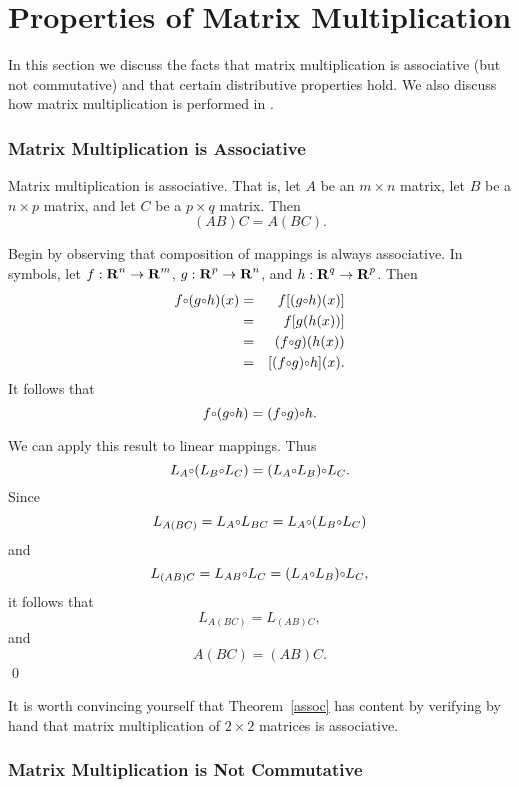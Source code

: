 \section{Properties of Matrix Multiplication} \label{S:4.7}

In this section we discuss the facts that matrix multiplication is
associative (but not commutative) and that certain distributive
properties hold.  We also discuss how matrix multiplication is
performed in \Matlab.

\subsubsection*{Matrix Multiplication is Associative}

\begin{thm} \label{assoc}
Matrix multiplication is associative.  That is, let $A$ be an
$m\times n$ matrix, let $B$ be a $n\times p$ matrix, and let $C$
be a $p\times q$ matrix.  Then
\[
(AB)C = A(BC).
\]
\end{thm}

\proof Begin by observing that composition of mappings is always
associative.  In symbols, let $f:\mbox{$\bf{R}$}^n\to\mbox{$\bf{R}$}^m$, $g:\mbox{$\bf{R}$}^p\to\mbox{$\bf{R}$}^n$,
and $h:\mbox{$\bf{R}$}^q\to\mbox{$\bf{R}$}^p$.  Then
\begin{eqnarray*}
f\compose (g\compose h)(x) & = & f[(g\compose h)(x)] \\
  & = & f[g(h(x))] \\
  & = & (f\compose g)(h(x)) \\
  & = & [(f\compose g)\compose h](x).
\end{eqnarray*}
It follows that
\[
f\compose (g\compose h) = (f\compose g)\compose h.
\]

We can apply this result to linear mappings.  Thus
\[
L_A\compose (L_B\compose L_C) = (L_A\compose L_B)\compose L_C.
\]
Since
\[
L_{A(BC)} = L_A\compose L_{BC} = L_A\compose (L_B\compose L_C)
\]
and
\[
L_{(AB)C} = L_{AB}\compose L_C = (L_A\compose L_B)\compose L_C,
\]
it follows that
\[
L_{A(BC)} = L_{(AB)C},
\]
and
\[
A(BC) = (AB)C.
\]
\qed

It is worth convincing yourself that Theorem~\ref{assoc} has
content by verifying by hand that matrix multiplication of
$2\times 2$ matrices is associative.

\subsubsection*{Matrix Multiplication is Not Commutative}

